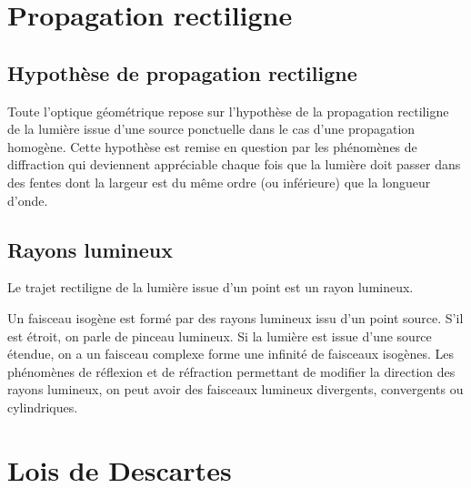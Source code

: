 \section{Propagation rectiligne}
\label{chap6-sec:propagationrectiligne}
%
\subsection{Hypothèse de propagation rectiligne}
\label{chap6-subsec:hypothesedepropagationrectiligne}
%
Toute l'optique géométrique repose sur l'hypothèse de la propagation rectiligne de la lumière issue d'une source ponctuelle dans le cas d'une propagation homogène. Cette hypothèse est remise en question par les phénomènes de diffraction qui deviennent appréciable chaque fois que la lumière doit passer dans des fentes dont la largeur est du même ordre (ou inférieure) que la longueur d'onde.
%
\subsection{Rayons lumineux}\label{chap6-subsec:rayonslumineux}
%
\begin{defdef}
 Le trajet rectiligne de la lumière issue d'un point est un rayon lumineux.
\end{defdef}
%
Un faisceau isogène est formé par des rayons lumineux issu d'un point source. S'il est étroit, on parle de pinceau lumineux. Si la lumière est issue d'une source étendue, on a un faisceau complexe forme une infinité de faisceaux isogènes. Les phénomènes de réflexion et de réfraction permettant de modifier la direction des rayons lumineux, on peut avoir des faisceaux lumineux divergents, convergents ou cylindriques.
%
\section{Lois de Descartes}\label{chap6-sec:LoisdeSnellDescartes}
%
